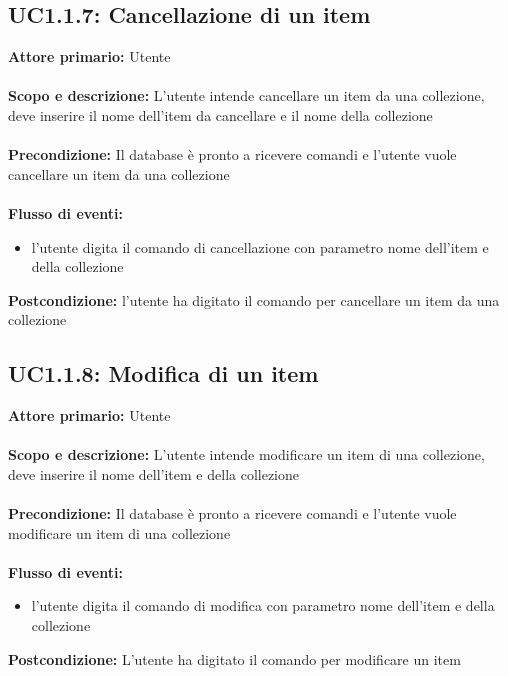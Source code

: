 \documentclass{scalatekids-article}
\begin{document}
\subsection{UC1.1.7: Cancellazione di un item}
\textbf{Attore primario:} Utente \\ \\
\textbf{Scopo e descrizione:} L’utente intende cancellare un item da una collezione, deve inserire il nome dell’item da cancellare e il nome della collezione\\ \\
\textbf{Precondizione:} Il database è pronto a ricevere comandi e l’utente vuole cancellare un item da una collezione\\ \\
\textbf{Flusso di eventi:}
\begin{itemize}
\item l’utente digita il comando di cancellazione con parametro nome dell’item e della collezione
\end{itemize}
\textbf{Postcondizione:} l’utente ha digitato il comando per cancellare un item da una collezione
\subsection{UC1.1.8: Modifica di un item}
\textbf{Attore primario:} Utente \\ \\
\textbf{Scopo e descrizione:} L’utente intende modificare un item di una collezione, deve inserire il nome dell’item e della collezione\\ \\
\textbf{Precondizione:} Il database è pronto a ricevere comandi e l’utente vuole modificare un item di una collezione\\ \\
\textbf{Flusso di eventi:}
\begin{itemize}
\item l’utente digita il comando di modifica con parametro nome dell’item e della collezione
\end{itemize}
\textbf{Postcondizione:} L’utente ha digitato il comando per modificare un item
\end{document}

